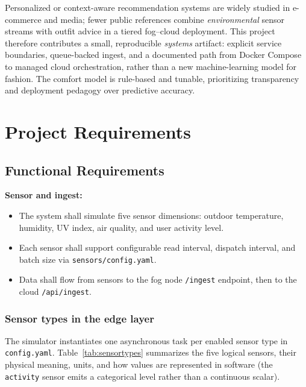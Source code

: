 \documentclass[conference]{IEEEtran}
\begin{document}
Personalized or context-aware recommendation systems are widely studied in e-commerce and media; fewer public references combine \emph{environmental} sensor streams with outfit advice in a tiered fog--cloud deployment. This project therefore contributes a small, reproducible \emph{systems} artifact: explicit service boundaries, queue-backed ingest, and a documented path from Docker Compose to managed cloud orchestration, rather than a new machine-learning model for fashion. The comfort model is rule-based and tunable, prioritizing transparency and deployment pedagogy over predictive accuracy.

\section{Project Requirements}

\subsection{Functional Requirements}
\textbf{Sensor and ingest:}
\begin{itemize}
  \item The system shall simulate five sensor dimensions: outdoor temperature, humidity, UV index, air quality, and user activity level.
  \item Each sensor shall support configurable read interval, dispatch interval, and batch size via \texttt{sensors/config.yaml}.
  \item Data shall flow from sensors to the fog node \texttt{/ingest} endpoint, then to the cloud \texttt{/api/ingest}.
\end{itemize}

\subsubsection{Sensor types in the edge layer}
The simulator instantiates one asynchronous task per enabled sensor type in \texttt{config.yaml}. Table~\ref{tab:sensortypes} summarizes the five logical sensors, their physical meaning, units, and how values are represented in software (the \texttt{activity} sensor emits a categorical level rather than a continuous scalar).
\end{document}
